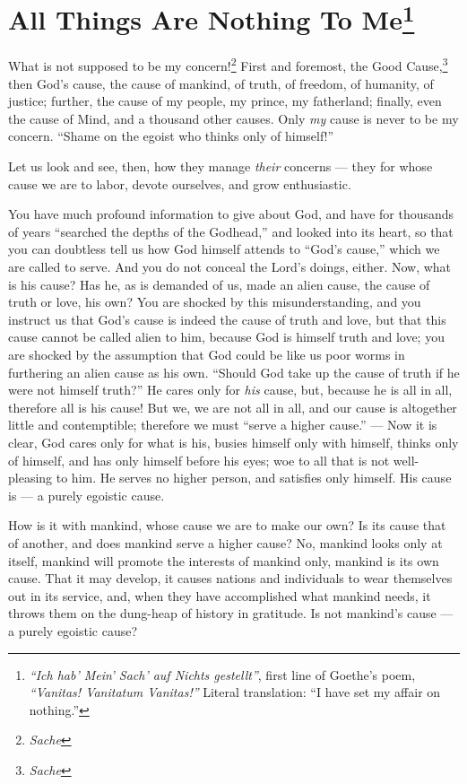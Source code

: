 
\chapter[All Things Are Nothing To Me]{\centering All Things 
Are Nothing To Me\footnote{\textit{``Ich hab' 
Mein' Sach' auf Nichts gestellt''}, first line of Goethe's poem, 
\textit{``Vanitas! Vanitatum Vanitas!''} Literal translation: ``I have set 
my affair on nothing.''}}

What is not supposed to be my concern!\footnote{\textit{Sache}} First and 
foremost, the Good Cause,\footnote{\textit{Sache}} then God's cause, the cause 
of mankind, of truth, of freedom, of humanity, of justice; further, the cause 
of my people, my prince, my fatherland; finally, even the cause of Mind, and a 
thousand other causes. Only \textit{my} cause is never to be my concern. 
``Shame on the egoist who thinks only of himself!''

Let us look and see, then, how they manage \textit{their} concerns --- they for 
whose cause we are to labor, devote ourselves, and grow enthusiastic.

You have much profound information to give about God, and have for thousands 
of years ``searched the depths of the Godhead,'' and looked into its heart, 
so that you can doubtless tell us how God himself attends to ``God's 
cause,'' which we are called to serve. And you do not conceal the Lord's 
doings, either. Now, what is his cause? Has he, as is demanded of us, made an 
alien cause, the cause of truth or love, his own? You are shocked by this 
misunderstanding, and you instruct us that God's cause is indeed the cause of 
truth and love, but that this cause cannot be called alien to him, because God 
is himself truth and love; you are shocked by the assumption that God could be 
like us poor worms in furthering an alien cause as his own. ``Should God take 
up the cause of truth if he were not himself truth?'' He cares only for 
\textit{his} cause, but, because he is all in all, therefore all is his cause! 
But we, we are not all in all, and our cause is altogether little and 
contemptible; therefore we must ``serve a higher cause.'' --- Now it is 
clear, God cares only for what is his, busies himself only with himself, 
thinks only of himself, and has only himself before his eyes; woe to all that 
is not well-pleasing to him. He serves no higher person, and satisfies only 
himself. His cause is --- a purely egoistic cause.

How is it with mankind, whose cause we are to make our own? Is its cause that 
of another, and does mankind serve a higher cause? No, mankind looks only at 
itself, mankind will promote the interests of mankind only, mankind is its own 
cause. That it may develop, it causes nations and individuals to wear 
themselves out in its service, and, when they have accomplished what mankind 
needs, it throws them on the dung-heap of history in gratitude. Is not 
mankind's cause --- a purely egoistic cause?

